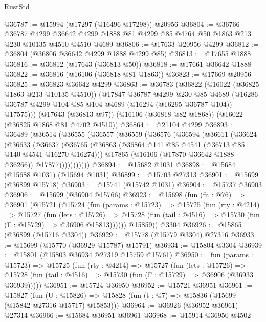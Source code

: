 \begin{lexlean}{RustStd}
\begin{coremodule}
@36787 := @15994 (@17297 (@16496 @17298)) @20956
@36804 := @36766
    @36787
    @4299
    @36642
    @4299
    @1888
    @81
    @4299
    @85
    @4764
    @50
    @1863
    @213
    @230
    @10135
    @4510
    @4510
    @4689
@36806 := @17633 @20956 @4299
@36812 := @36804 (@36806 @36642 @4299 @1888 @4299 @85)
@36813 := @17655 @1888
@36816 := @36812 (@17643 (@36813 @50))
@36818 := @17661 @36642 @1888
@36822 := @36816 (@16106 (@36818 @81 @1863))
@36823 := @17669 @20956
@36825 := @36823 @36642 @4299
@36863 := @36783
    (@36822
      (@16022 (@36825 @1863 @213 @10135 @4510))
      (@17847
        @36787
        @4299
        @230
        @85
        @4689
        (@16286 @36787 @4299 @104 @85 @104 @4689 (@16294 (@16295 @36787 @104)) @17575)))
    (@17643 (@36813 @97))
    (@16106 (@36818 @82 @1868))
    (@16022 (@36825 @1868 @81 @4702 @4510))
@36864 := @21104 @4299
@36893 := @36489
    (@36514
      (@36555
        (@36557
          (@36559
            (@36576
              (@36594
                (@36611
                  (@36624
                    (@36633
                      (@36637
                        (@36765
                          (@36863 (@36864 @141 @85 @4541 (@36713 @85 @140 @4541 @16270 @16274)))
                          @17865
                          (@16106 (@17870 @36642 @1888 @36266))
                          @17877)))))))))))
@36894 := @15682 @1031
@36898 := @15684 (@15688 @1031) (@15694 @1031)
@36899 := @15703 @27313
@36901 := @15699 (@36899 @15718)
@36903 := @15741 (@15742 @1031)
@36904 := @15737 @36903
@36906 := @15699 (@36904 @15766)
@36923 := @15698
    (fun (fn : @76) =>
    @36901
      (@15721
        (@15724
          (fun (params : @15723) =>
          @15725
            (fun (rty : @4214) =>
            @15727
              (fun (lets : @15726) =>
              @15728 (fun (tail : @4516) => @15730 (fun (Γ : @15729) => @36906 @15813))))))
        @15859))
    @3304
@36926 := @15865 (@36899 (@15716 @3304))
@36929 := @15778 (@15779 @3304) @27316
@36933 := @15699 (@15770 (@36929 @15787) @15791)
@36934 := @15804 @3304
@36939 := @15801 (@15803 @36934 @27319 @15759 @15761)
@36950 := fun (params : @15723) =>
  @15725
    (fun (rty : @4214) =>
    @15727
      (fun (lets : @15726) =>
      @15728 (fun (tail : @4516) => @15730 (fun (Γ : @15729) => @36906 (@36933 @36939)))))
@36951 := @15724 @36950
@36952 := @15721 @36951
@36961 := @15827
    (fun (U : @15826) => @15828 (fun (t : @7) => @15836 (@15699 (@15842 @27316 @15717) @15853)))
@36964 := @36926 (@36952 @36961) @27314
@36966 := @15684 @36951 @36961
@36968 := @15914 @36950 @4502

\end{coremodule}
\end{lexlean}
